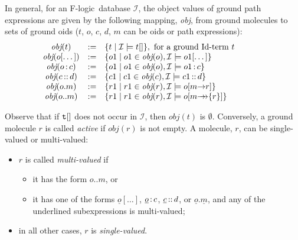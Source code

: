 \documentclass[11pt]{article}
\newcommand{\obj}{\textit{obj}\xspace}
\newcommand{\db}[1]{\ensuremath{\mathcal{#1}}}
\newcommand{\isa}{\,{\bf{:}}\,}
\newcommand{\subcl}{\,{\bf{::}}\,}
\newcommand{\fd}{\ensuremath{{\rightarrow}}}                   %
\newcommand{\mvd}{\ensuremath{{\rightarrow\!\!\!\!\rightarrow}}}  %
\newcommand{\fl}{\mbox{F-logic}\xspace}
\begin{document}
In general, for an \fl\ database \db I, the object values of ground path
expressions are given by the following mapping, \obj, from ground molecules
to sets of ground oids ($t$, $o$, $c$, $d$, $m$ can be oids or path
expressions):
%
\begin{displaymath}
  \begin{array}{cll@{\hspace{4em}}c}
    \obj(t) & := & \{t \mid  \db I\models t[] \}, 
     \textrm{ for a ground Id-term $t$}  \\   
    \obj(o[\dots]) & := & \{o1 \mid o1\in\obj(o), \db I \models o1[\dots]
    \} \\  
    \obj(o\isa c) & := & \{o1 \mid o1\in\obj(o), \db I \models o1\isa c\}
     \\ 
    \obj(c\subcl d) & := & \{c1 \mid c1\in\obj(c), \db I \models c1\subcl
    d\} \\ 
    \obj(o.m) & :=  & \{r1 \mid r1\in\obj(r), \db I \models o[m\fd
    r]\} \\ 
    \obj(o..m) & := &  \{r1 \mid  r1\in\obj(r), \db I \models
    o[m{\mvd}\{r\}] \}
  \end{array}
\end{displaymath}

Observe that if $\tt t[]$ does not occur in \db{I}, then $\obj(t)$ is
$\emptyset$.  Conversely, a ground molecule $r$ is called \emph{active} if
$\obj(r)$ is not empty. A molecule, $r$, can be 
single-valued or multi-valued:
\begin{itemize}
\item $r$ is called \emph{multi-valued} if
 \begin{itemize}
  \item it has the form $o..m$, or 
  \item it has one of the forms $\underline{o}[\dots]$,
    $\underline{o}\isa c$, $\underline{c}\subcl d$, or
    $\underline{o}.\underline{m}$, and any of the underlined
    subexpressions is multi-valued;
 \end{itemize}
\item in all other cases, $r$ is \emph{single-valued}.
\end{itemize}
\end{document}
